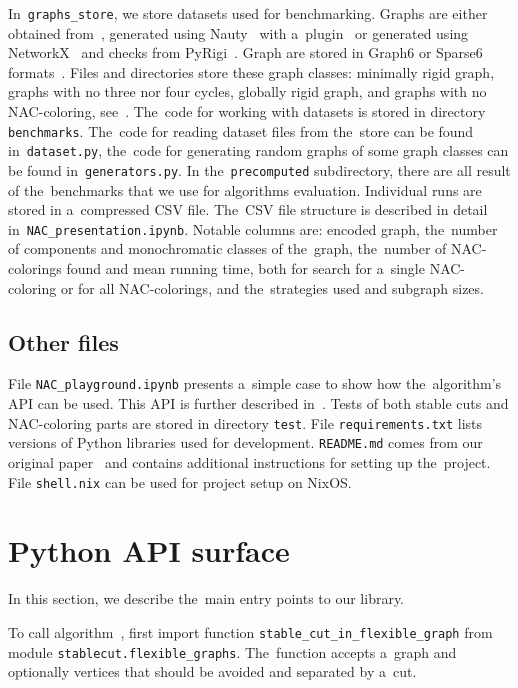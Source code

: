 In~\texttt{graphs\_store}, we store datasets used for benchmarking.
Graphs are either obtained from~\cite{extremal_graphs},
generated using Nauty~\cite{nauty} with a~plugin~\cite{nauty_plugin}
or generated using NetworkX~\cite{networkx} and checks from PyRigi~\cite{pyrigi}.
Graph are stored in Graph6 or Sparse6 formats~\cite{graph6}.
%
Files and directories store these graph classes:
minimally rigid graph, graphs with no three nor four cycles, globally rigid graph,
and graphs with no NAC-coloring, see~.
%
The~code for working with datasets is stored in directory \texttt{benchmarks}.
The~code for reading dataset files from the~store can be found in~\texttt{dataset.py},
the~code for generating random graphs of some graph classes
can be found in~\texttt{generators.py}.
%
In the~\texttt{precomputed} subdirectory, there are all result of the~benchmarks that
we use for algorithms evaluation.
Individual runs are stored in a~compressed CSV file.
The~CSV file structure is described in detail in~\texttt{NAC\_presentation.ipynb}.
Notable columns are:
encoded graph,
the~number of \trcon{} components and monochromatic classes of the~graph,
the~number of NAC-colorings found and mean running time,
both for search for a~single NAC-coloring or for all NAC-colorings,
and the~strategies used and subgraph sizes.


\subsection{Other files}

File \texttt{NAC\_playground.ipynb} presents a~simple case
to show how the~algorithm's API can be used.
This API is further described in~.
%
Tests of both stable cuts and NAC-coloring parts are stored in directory \texttt{test}.
%
File \texttt{requirements.txt} lists versions of Python libraries used for development.
\texttt{README.md} comes from our original paper~\cite{my_paper}
and contains additional instructions for setting up the~project.
File \texttt{shell.nix} can be used for project setup on NixOS\@.


\section{Python API surface}%
\label{sec:impl_python_api}

In this section,
we describe the~main entry points to our library.

To call algorithm~,
first import function \texttt{stable\_cut\_in\_flexible\_graph}
from module \texttt{stablecut.flexible\_graphs}.
The~function accepts a~graph and
optionally vertices that should be avoided and separated by a~cut.

